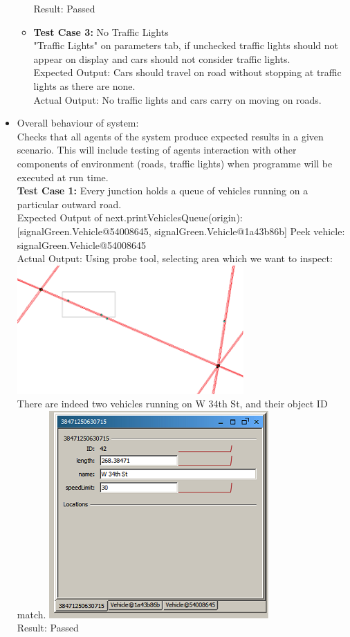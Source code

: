 \documentclass[11pt, oneside]{article}   	%
\begin{document}
\begin{itemize}
\begin{itemize}
Result: Passed
\item \textbf{Test Case 3:} No Traffic Lights\hfill \\
"Traffic Lights" on parameters tab, if unchecked traffic lights should not appear on display and cars should not consider traffic lights.\hfill \\
Expected Output: Cars should travel on road without stopping at traffic lights as there are none.\hfill \\
Actual Output: No traffic lights and cars carry on moving on roads.
\end{itemize}
\item Overall behaviour of system: \hfill \\
Checks that all agents of the system produce expected results in a given scenario. This will include testing of agents interaction with other components of environment (roads, traffic lights) when programme will be executed at run time.\hfill \\
\textbf{Test Case 1:} Every junction holds a queue of vehicles running on a particular outward road.\hfill \\
Expected Output of next.printVehiclesQueue(origin):[signalGreen.Vehicle@54008645, signalGreen.Vehicle@1a43b86b] Peek vehicle: signalGreen.Vehicle@54008645\hfill \\
Actual Output: Using probe tool, selecting area which we want to inspect:\hfill \\
\includegraphics{RoadNetwork}\hfill \\
There are indeed two vehicles running on W 34th St, and their object ID match.
\includegraphics{Sim}\hfill \\
Result: Passed
\end{itemize}
\end{document}
